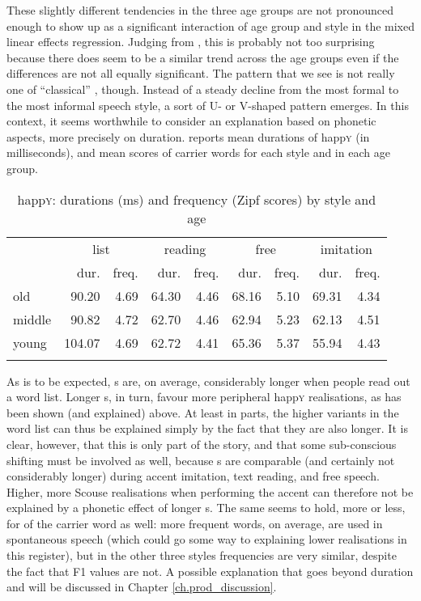 These slightly different tendencies in the three age groups are not pronounced enough to show up as a significant interaction of age group and style in the mixed linear effects regression.
Judging from , this is probably not too surprising because there does seem to be a similar trend across the age groups even if the differences are not all equally significant.
The pattern that we see is not really one of ``classical'' , though.
Instead of a steady decline from the most formal to the most informal speech style, a sort of U- or V-shaped pattern emerges.
In this context, it seems worthwhile to consider an explanation based on phonetic aspects, more precisely on duration.
 reports mean durations of happ\textsc{y} (in milliseconds), and mean  scores of carrier words for each style and in each age group.

\begin{table}
	
	\caption{happ\textsc{y}: durations (ms) and frequency (Zipf scores) by style and age}
	\label{tab.dur.style.happy}
	\begin{tabular}{lrrrrrrrr}
		\lsptoprule
		& \multicolumn{2}{c}{list} & \multicolumn{2}{c}{reading} & \multicolumn{2}{c}{free} & \multicolumn{2}{c}{imitation\is{accent performance}}\\
		& dur. & freq. & dur. & freq. & dur. & freq. & dur. & freq.\\
		\midrule
		old & 90.20 & 4.69 & 64.30 & 4.46 & 68.16 & 5.10 & 69.31 & 4.34\\
		middle & 90.82 & 4.72 & 62.70 & 4.46 & 62.94 & 5.23 & 62.13 & 4.51\\
		young & 104.07 & 4.69 & 62.72 & 4.41 & 65.36 & 5.37 & 55.94 & 4.43\\
		\lspbottomrule
	\end{tabular}
\end{table}

As is to be expected, s are, on average, considerably longer when people read out a word list.
Longer s, in turn, favour more peripheral happ\textsc{y} realisations, as has been shown (and explained) above.
At least in parts, the higher variants in the word list can thus be explained simply by the fact that they are also longer.
It is clear, however, that this is only part of the story, and that some sub-conscious shifting must be involved as well, because s are comparable (and certainly not considerably longer) during accent imitation, text reading, and free speech.
Higher, more Scouse realisations when performing the accent can therefore not be explained by a phonetic effect of longer s.
The same seems to hold, more or less, for  of the carrier word as well: more frequent words, on average, are used in spontaneous speech (which could go some way to explaining lower realisations in this register), but in the other three styles frequencies are very similar, despite the fact that F1 values are not.
A possible explanation that goes beyond duration and  will be discussed in Chapter \ref{ch.prod_discussion}.

